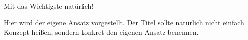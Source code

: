 Mit das Wichtigste natürlich!

Hier wird der eigene Ansatz vorgestellt. Der Titel sollte natürlich nicht einfach Konzept heißen, sondern konkret den eigenen Ansatz benennen.

